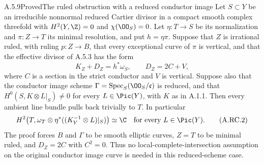 \begin{statement}{A.5.9}{Proved}{The ruled obstruction with a reduced conductor image}
Let $S\subset Y$ be an irreducible nonnormal reduced Cartier
divisor in a compact smooth complex threefold with
$H^2(Y,\Z)=0$ and $\chi(\OO_S)=0$.
Let $\eta:T\to S$ be its normalization and
$\pi:Z\to T$ its minimal resolution, and put $h=\eta\pi$.
Suppose that $Z$ is irrational ruled, with ruling $p:Z\to B$,
that every exceptional curve of $\pi$ is vertical, and that
the effective divisor of A.5.3 has the form
\[
 K_Z+D_Z=h^*\omega_S,\qquad D_Z=2C+V,                 \tag{A.RC.1}
\]
where $C$ is a section in the strict conductor and $V$ is
vertical. Suppose also that the conductor image scheme
$\Gamma=\operatorname{Spec}_S(\OO_S/\mathfrak c)$ is reduced,
and that $H^0(S,K\otimes L|_S)\ne0$ for every $L\in\Pic(Y)$,
with $K$ as in A.1.1.
Then every ambient line bundle pulls back trivially to $T$.
In particular
\[
 H^2\bigl(T,\omega_T\otimes
       \eta^*((K_Y^{-1}\otimes L)|_S)\bigr)\simeq\C
       \quad\hbox{for every }L\in\Pic(Y).            \tag{A.RC.2}
\]
The proof forces $B$ and $\Gamma$ to be smooth elliptic curves,
$Z=T$ to be minimal ruled, and $D_Z=2C$ with $C^2=0$.
Thus no local-complete-intersection assumption on the original
conductor image curve is needed in this reduced-scheme case.
\end{statement}
